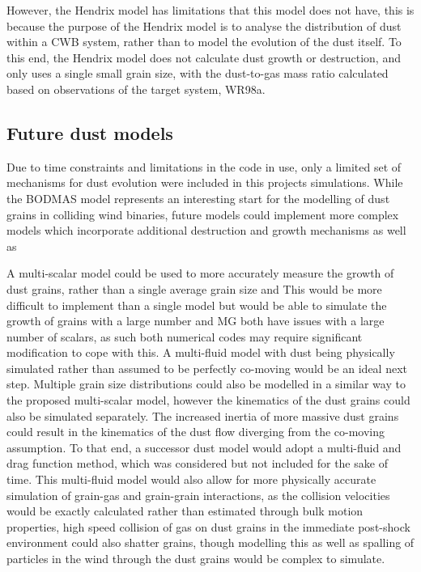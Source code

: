 However, the Hendrix model has limitations that this model does not have, this is because the purpose of the Hendrix model is to analyse the distribution of dust within a CWB system, rather than to model the evolution of the dust itself.
To this end, the Hendrix model does not calculate dust growth or destruction, and only uses a single small grain size, with the dust-to-gas mass ratio calculated based on observations of the target system, WR98a.



\subsection{Future dust models}


Due to time constraints and limitations in the code in use, only a limited set of mechanisms for dust evolution were included in this projects simulations.
While the BODMAS model represents an interesting start for the modelling of dust grains in colliding wind binaries, future models could implement more complex models which incorporate additional destruction and growth mechanisms as well as 

A multi-scalar model could be used to more accurately measure the growth of dust grains, rather than a single average grain size and 
This would be more difficult to implement than a single model but would be able to simulate the growth of grains with a large number 
\athena{} and MG both have issues with a large number of scalars, as such both numerical codes may require significant modification to cope with this.
A multi-fluid model with dust being physically simulated rather than assumed to be perfectly co-moving would be an ideal next step.
Multiple grain size distributions could also be modelled in a similar way to the proposed multi-scalar model, however the kinematics of the dust grains could also be simulated separately.
The increased inertia of more massive dust grains could result in the kinematics of the dust flow diverging from the co-moving assumption.
To that end, a successor dust model would adopt a multi-fluid and drag function method, which was considered but not included for the sake of time.
This multi-fluid model would also allow for more physically accurate simulation of grain-gas and grain-grain interactions, as the collision velocities would be exactly calculated rather than estimated through bulk motion properties, high speed collision of gas on dust grains in the immediate post-shock environment could also shatter grains, though modelling this as well as spalling of particles in the wind through the dust grains would be complex to simulate. 

